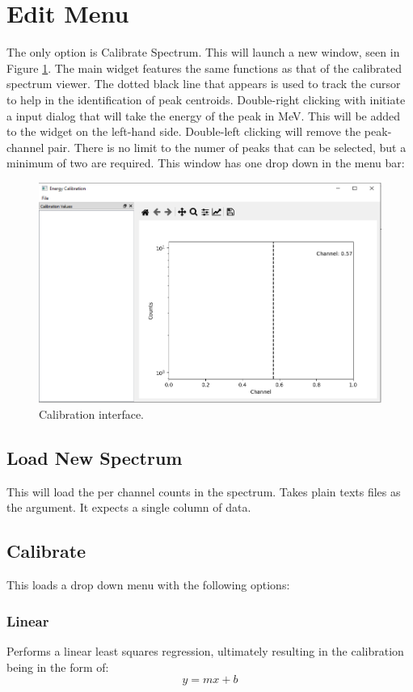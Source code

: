 \section{Edit Menu}
The only option is Calibrate Spectrum. This will launch a new window, seen in Figure \ref{fig:calibrate_window}. The main widget features the same functions as that of the calibrated spectrum viewer. The dotted black line that appears is used to track the cursor to help in the identification of peak centroids. Double-right clicking with initiate a input dialog that will take the energy of the peak in MeV. This will be added to the widget on the left-hand side. Double-left clicking will remove the peak-channel pair. There is no limit to the numer of peaks that can be selected, but a minimum of two are required. This window has one drop down in the menu bar: 
\begin{figure}[h!]
	\centering
	\includegraphics[width=\linewidth]{Calibrate.png}
	\caption{Calibration interface.}
	\label{fig:calibrate_window}
\end{figure}


	\subsection{Load New Spectrum}
		This will load the per channel counts in the spectrum. Takes plain texts files as the argument. It expects a single column of data.

	\subsection{Calibrate}
		This loads a drop down menu with the following options:
				\subsubsection{Linear}
				Performs a linear least squares regression, ultimately resulting in the calibration being in the form of:
				\begin{equation}
				 	y=mx+b
				\label{eq:linear}
				\end{equation}
